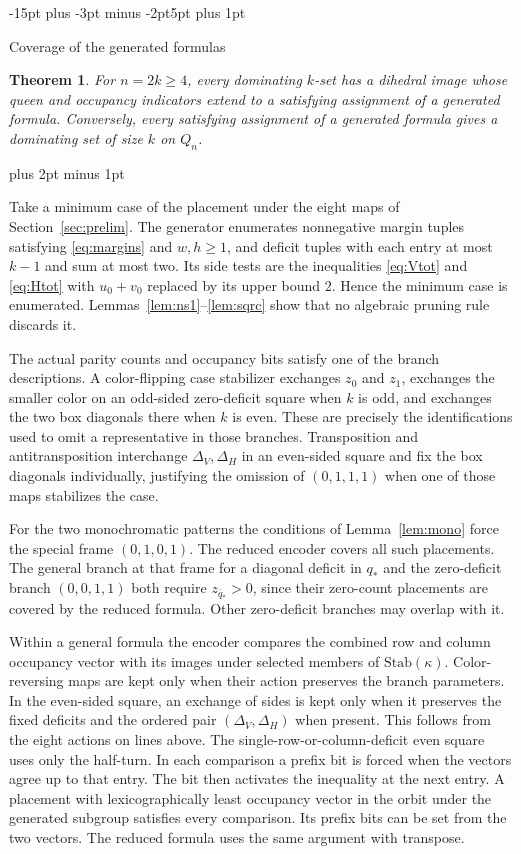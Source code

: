 \documentclass[11pt,a4paper]{article}
\makeatletter
\renewcommand{\subsection}{\@startsection{subsection}{2}{\z@}%
  {-15pt plus -3pt minus -2pt}{5pt plus 1pt}%
  {\normalfont\bfseries\raggedright}}
\renewenvironment{proof}[1][\proofname]{%
  \par\pushQED{\qed}\normalfont
  \topsep8pt plus 2pt minus 1pt\relax
  \trivlist\item[\hskip\labelsep\itshape #1\@addpunct{.}]\ignorespaces
}{\popQED\endtrivlist\@endpefalse}
\theoremstyle{result}
\newtheorem{theorem}{Theorem}[section]
\theoremstyle{definition}
\theoremstyle{remark}
\newcommand{\Stab}{\mathrm{Stab}}
\makeatother
\begin{document}
\subsection{Coverage of the generated formulas}

\begin{theorem}\label{thm:coverage}
For $n=2k\ge4$, every dominating $k$-set has a dihedral image whose
queen and occupancy indicators extend to a satisfying assignment
of a generated formula. Conversely, every satisfying assignment of
a generated formula gives a dominating set of size $k$ on $Q_n$.
\end{theorem}

\begin{proof}
Take a minimum case of the placement under the eight maps of
Section~\ref{sec:prelim}. The generator enumerates nonnegative
margin tuples satisfying \eqref{eq:margins} and $w,h\ge1$, and
deficit tuples with each entry at most $k-1$ and sum at most two.
Its side tests are the inequalities \eqref{eq:Vtot} and
\eqref{eq:Htot} with $u_0+v_0$ replaced by its upper bound $2$.
Hence the minimum case is enumerated. Lemmas~\ref{lem:ns1}--\ref{lem:sqrc}
show that no algebraic pruning rule discards it.

The actual parity counts and occupancy bits satisfy one of the
branch descriptions. A color-flipping case stabilizer exchanges
$z_0$ and $z_1$, exchanges the smaller color on an odd-sided
zero-deficit square when $k$ is odd, and exchanges the two box
diagonals there when $k$ is even. These are precisely the
identifications used to omit a representative in those
branches. Transposition and antitransposition interchange
$\Delta_V,\Delta_H$ in an even-sided square and fix the box
diagonals individually, justifying the omission of $(0,1,1,1)$
when one of those maps stabilizes the case.

For the two monochromatic patterns the conditions of
Lemma~\ref{lem:mono} force the special frame $(0,1,0,1)$.
The reduced encoder covers all such placements. The general
branch at that frame for a diagonal deficit in $q_*$ and the
zero-deficit branch $(0,0,1,1)$ both require $z_{\bar q_*}>0$,
since their zero-count placements are covered by the reduced
formula. Other zero-deficit branches may overlap with it.

Within a general formula the encoder compares the combined row
and column occupancy vector with its images under selected
members of $\Stab(\kappa)$. Color-reversing maps are kept only
when their action preserves the branch parameters. In the even-sided
square, an exchange of sides is kept only when it preserves the
fixed deficits and the ordered pair $(\Delta_V,\Delta_H)$ when
present. This follows from the eight actions on lines above. The
single-row-or-column-deficit even square uses only the half-turn.
In each comparison a prefix bit is forced when the vectors agree
up to that entry. The bit then activates the inequality at the
next entry. A placement with lexicographically least occupancy
vector in the orbit under the generated subgroup satisfies every
comparison. Its prefix bits can be set from the two vectors. The
reduced formula uses the same argument with transpose.


\end{proof}
\end{document}
